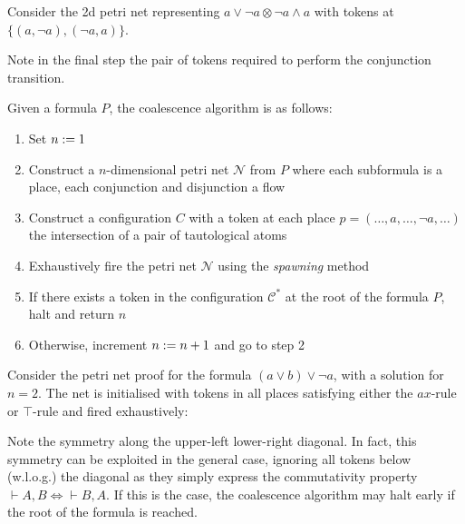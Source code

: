     \begin{example}
        Consider the 2d petri net representing $a \vee \neg a \otimes \neg a \wedge a$ with tokens at $\{(a, \neg a), (\neg a, a)\}$.
        
        Note in the final step the pair of tokens required to perform the conjunction transition.
    \end{example}
    
    
    \begin{definition}[Coalescence]
        Given a formula $P$, the coalescence algorithm is as follows:
        \begin{enumerate}[nosep]
            \item Set  $n := 1$
            \item Construct a $n$-dimensional petri net $\mathcal{N}$ from $P$ where each subformula is a place, each conjunction and disjunction a flow
            \item Construct a configuration $C$ with a token at each place $p = (\ldots, a, \ldots, \neg a, \ldots)$ the intersection of a pair of tautological atoms
            \item Exhaustively fire the petri net $\mathcal{N}$ using the \textit{spawning} method
            \item If there exists a token in the configuration $\mathcal{C^*}$ at the root of the formula $P$, halt and return $n$
            \item Otherwise, increment $n := n + 1$ and go to step 2
        \end{enumerate}
    \end{definition}
    
    \begin{example}
        Consider the petri net proof for the formula $(a \vee b) \vee \neg a$, with a solution for $n = 2$.
        The net is initialised with tokens in all places satisfying either the $ax$-rule or $\top$-rule and fired exhaustively:
        
    \end{example}

    \begin{remark}
        Note the symmetry along the upper-left lower-right diagonal.
        In fact, this symmetry can be exploited in the general case, ignoring all tokens below (w.l.o.g.) the diagonal as they simply express the commutativity property $\vdash A, B \iff \vdash B, A$.
        If this is the case, the coalescence algorithm may halt early if the root of the formula is reached.
    \end{remark}
    
